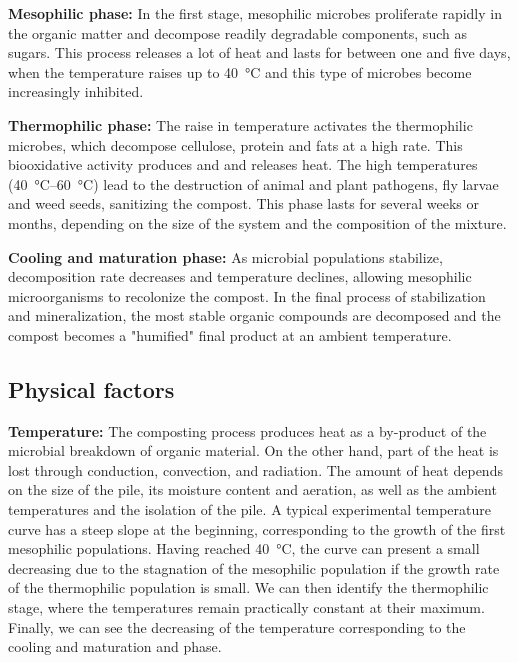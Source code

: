 \documentclass[12pt, a4paper, twocolumn]{article}
\numberwithin{table}{section}
\numberwithin{figure}{section}
\numberwithin{equation}{section}
\begin{document}
\textbf{Mesophilic phase:} In the first stage, mesophilic microbes proliferate rapidly in the organic matter and decompose readily degradable components, such as sugars. This process releases a lot of heat and lasts for between one and five days, when the temperature raises up to \SI{40}{\celsius} and this type of microbes become increasingly inhibited.

\textbf{Thermophilic phase:} The raise in temperature activates the thermophilic microbes, which decompose cellulose, protein and fats at a high rate. This biooxidative activity produces  and  and releases heat. The high temperatures (\SIrange{40}{60}{\celsius}) lead to the destruction of animal and plant pathogens, fly larvae and weed seeds, sanitizing the compost. This phase lasts for several weeks or months, depending on the size of the system and the composition of the mixture.

\textbf{Cooling and maturation phase:} As microbial populations stabilize, decomposition rate decreases and temperature declines, allowing mesophilic microorganisms to recolonize the compost. In the final process of stabilization and mineralization, the most stable organic compounds are decomposed and the compost becomes a "humified" final product at an ambient temperature.
 
\subsection{Physical factors}
\textbf{Temperature:} The composting process produces heat as a by-product of the microbial breakdown of organic material. On the other hand, part of the heat is lost through conduction, convection, and radiation. The amount of heat depends on the size of the pile, its moisture content and aeration, as well as the ambient temperatures and the isolation of the pile. A typical experimental temperature curve has a steep slope at the beginning, corresponding to the growth of the first mesophilic populations. Having reached \SI{40}{\celsius}, the curve can present a small decreasing due to the stagnation of the mesophilic population if the growth rate of the thermophilic population is small. We can then identify the thermophilic stage, where the temperatures remain practically constant at their maximum. Finally, we can see the decreasing of the temperature corresponding to the cooling and maturation and phase.
\end{document}
